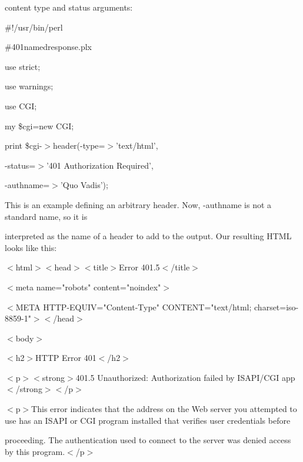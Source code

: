 \documentclass[a4paper,11pt]{book}
\begin{document}
\noindent content type and status arguments:

\noindent 

\noindent \#!/usr/bin/perl

\noindent \#401namedresponse.plx

\noindent use strict;

\noindent use warnings;

\noindent use CGI;

\noindent my \$cgi=new CGI;

\noindent 

\noindent print \$cgi-$>$header(-type=$>$'text/html',

\noindent -status=$>$'401 Authorization Required',

\noindent -authname=$>$'Quo Vadis');

\noindent 

\noindent 

\noindent This is an example defining an arbitrary header. Now, -authname is not a standard name, so it is

\noindent interpreted as the name of a header to add to the output. Our resulting HTML looks like this:

\noindent 

\noindent 

\noindent $<$html$>$$<$head$>$$<$title$>$Error 401.5$<$/title$>$

\noindent 

\noindent $<$meta name="robots" content="noindex"$>$

\noindent $<$META HTTP-EQUIV="Content-Type" CONTENT="text/html; charset=iso-8859-1"$>$$<$/head$>$

\noindent 

\noindent $<$body$>$

\noindent 

\noindent $<$h2$>$HTTP Error 401$<$/h2$>$

\noindent 

\noindent $<$p$>$$<$strong$>$401.5 Unauthorized: Authorization failed by ISAPI/CGI app$<$/strong$>$$<$/p$>$

\noindent 

\noindent $<$p$>$This error indicates that the address on the Web server you attempted to use has an ISAPI or CGI program installed that verifies user credentials before

\noindent proceeding. The authentication used to connect to the server was denied access by this program.$<$/p$>$
\end{document}
